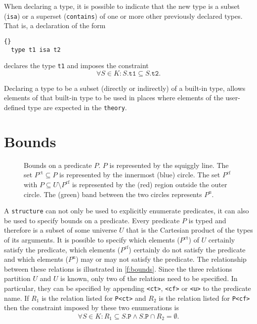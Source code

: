 \documentclass{article}
\begin{document}
When declaring a type, it is possible to indicate that the new type
is a subset (\texttt{isa}) or a superset (\texttt{contains}) of one
or more other previously declared types.
That is, a declaration of the form
\begin{lstlisting}{}
  type t1 isa t2
\end{lstlisting}
declares the type \texttt{t1} and imposes the constraint
$$
\forall S \in K : S.\mathtt{t1} \subseteq S.\mathtt{t2}
.
$$

Declaring a type to be a subset (directly or indirectly) of a built-in
type, allows elements of that built-in type to be used in places
where elements of the user-defined type are expected in the
\texttt{theory}.

\section{Bounds}

\begin{figure}
\centering%
\caption{Bounds on a predicate $P$.  $P$ is represented by the squiggly line.
The set $P^{\textrm{ct}} \subseteq P$ is represented by the innermost (blue)
circle.  The set $P^{\textrm{cf}}$ with
$P \subseteq U \setminus P^{\textrm{cf}}$ is represented by the (red) region
outside the outer circle.  The (green) band between the two circles
represents $P^{\textrm{u}}$.} 
\label{f:bounds}
\end{figure}

A \texttt{structure} can not only be used to explicitly enumerate
predicates, it can also be used to specify bounds on a predicate.
Every predicate $P$ is typed and therefore is a subset of some
universe $U$ that is the Cartesian product of the types of its
arguments.  It is possible to specify which elements ($P^{\textrm{ct}}$)
of $U$ certainly
satisfy the predicate, which elements ($P^{\textrm{cf}}$) certainly
do not satisfy
the predicate and which elements ($P^{\textrm{u}}$)
may or may not satisfy the predicate.
The relationship between these relations is illustrated in
\autoref{f:bounds}.  Since the three relations partition $U$ and
$U$ is known, only two of the relations need to be specified.
In particular, they can be specified by appending
\texttt{<ct>},
\texttt{<cf>} or
\texttt{<u>} to the predicate name.
If $R_1$ is the relation listed for \texttt{P<ct>} and
$R_2$ is the relation listed for \texttt{P<cf>}
then the constraint imposed by these two enumerations is
$$
\forall S \in K : R_1 \subseteq S.\mathtt{P}
  \wedge S.\mathtt{P} \cap R_2 = \emptyset
.
$$
\end{document}
